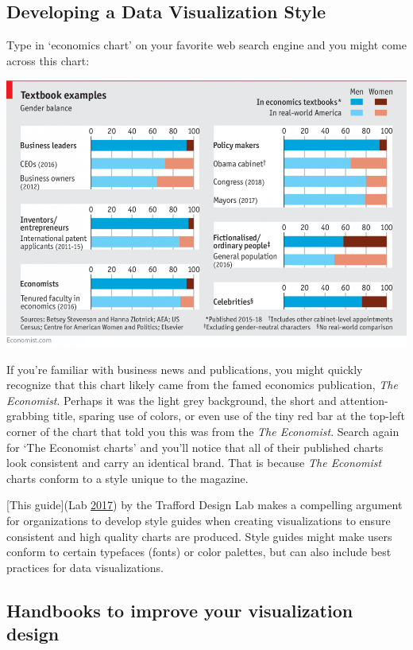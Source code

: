 \documentclass[]{book}
\begin{document}
\hypertarget{developing-a-data-visualization-style}{%
\subsection{Developing a Data Visualization Style}\label{developing-a-data-visualization-style}}

Type in `economics chart' on your favorite web search engine and you might come across this chart:

\includegraphics{images/economist_gender.png}

If you're familiar with business news and publications, you might quickly recognize that this chart likely came from the famed economics publication, \emph{The Economist}. Perhaps it was the light grey background, the short and attention-grabbing title, sparing use of colors, or even use of the tiny red bar at the top-left corner of the chart that told you this was from the \emph{The Economist}. Search again for `The Economist charts' and you'll notice that all of their published charts look consistent and carry an identical brand. That is because \emph{The Economist} charts conform to a style unique to the magazine.

{[}This guide{]}(Lab \protect\hyperlink{ref-Trafford}{2017}) by the Trafford Design Lab makes a compelling argument for organizations to develop style guides when creating visualizations to ensure consistent and high quality charts are produced. Style guides might make users conform to certain typefaces (fonts) or color palettes, but can also include best practices for data visualizations.

\hypertarget{handbooks-to-improve-your-visualization-design}{%
\subsection{Handbooks to improve your visualization design}\label{handbooks-to-improve-your-visualization-design}}
\end{document}
